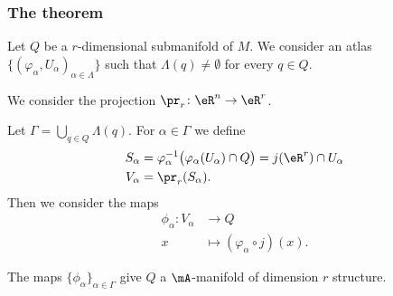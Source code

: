 \subsubsection{The theorem}


\begin{proposition}	\label{PROPooMKLBooTkqrph}
	Let \( Q\) be a \( r\)-dimensional submanifold of \( M\). We consider an atlas \( \{ (\varphi_{\alpha},U_{\alpha})_{\alpha\in \Lambda} \}\) such that \( \Lambda(q)\neq \emptyset\) for every \( q\in Q\).

	We consider the projection \(\pr_r \colon \eR^n\to \eR^r  \).

	Let \( \Gamma=\bigcup_{q\in Q}\Lambda(q)\). For \( \alpha\in \Gamma\) we define
	\begin{subequations}
		\begin{align}
			S_{\alpha} & =\varphi_{\alpha}^{-1}\big( \varphi_{\alpha}(U_{\alpha})\cap Q \big) =j(\eR^r)\cap U_{\alpha} \\
			V_{\alpha} & =\pr_r(S_{\alpha}).
		\end{align}
	\end{subequations}
	Then we consider the maps
	\begin{equation}
		\begin{aligned}
			\phi_{\alpha}\colon V_{\alpha} & \to Q                                 \\
			x                              & \mapsto (\varphi_{\alpha}\circ j)(x).
		\end{aligned}
	\end{equation}


	The maps \( \{ \phi_{\alpha} \}_{\alpha\in\Gamma}\) give \( Q\) a \( \mA\)-manifold of dimension \( r\) structure.
\end{proposition}

